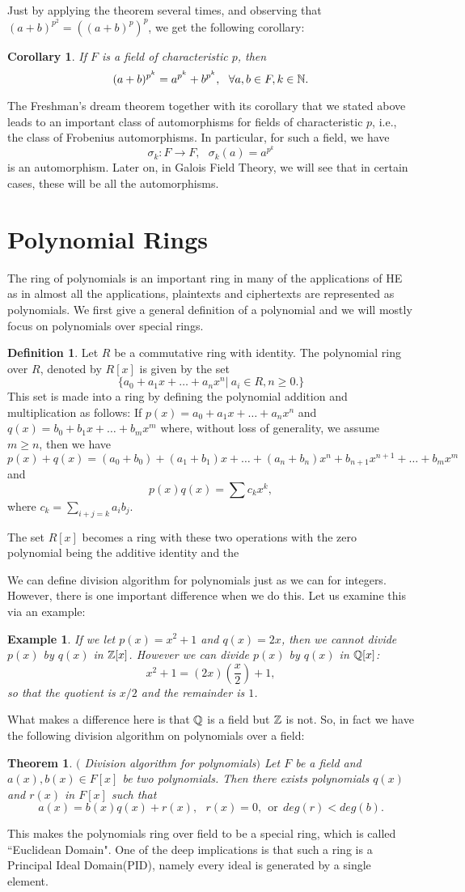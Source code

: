 \documentclass[12pt]{article}
\theoremstyle{plain}
\newtheorem{corollary}{Corollary}
\newtheorem{example}{Example}
\newtheorem{theorem}{Theorem}
\theoremstyle{definition}
\newtheorem{definition}{Definition}
\theoremstyle{remark}
\begin{document}
Just by applying the theorem several times, and observing that $(a+b)^{p^2} = ((a+b)^p)^p$, we get the following corollary:
\begin{corollary}
If $F$ is a field of characteristic $p$, then 
$$(a+b)^{p^k}= a^{p^k}+b^{p^k},  \:\:\:\forall a,b \in F, k\in \mathbb{N}.$$
\end{corollary}
The Freshman's dream theorem together with its corollary that we stated above leads to an important class of automorphisms for fields of characteristic $p$, i.e., the class of Frobenius automorphisms. In particular, for such a field, we have
$$\sigma_k:F\rightarrow F, \:\:\:\sigma_k(a)=a^{p^k}$$ is an automorphism. Later on, in Galois Field Theory, we will see that in certain cases, these will be all the automorphisms. 
\section{Polynomial Rings}
The ring of polynomials is an important ring in many of the applications of HE as in almost all the applications, plaintexts and ciphertexts are represented as polynomials. We first give a general definition of a polynomial and we will mostly focus on polynomials over special rings.
\begin{definition}
Let $R$ be a commutative ring with identity. The polynomial ring over $R$, denoted by $R[x]$ is given by the set 
$$\{a_0+a_1x+\dots +a_nx^n| \: a_i\in R, n\geq 0.\}$$
This set is made into a ring by defining the polynomial addition and multiplication as follows:
If $p(x)=a_0+a_1x+\dots +a_nx^n$ and $q(x)=b_0+b_1x+\dots+b_mx^m$ where, without loss of generality, we assume $m\geq n$, then we have
$$p(x)+q(x) = (a_0+b_0)+(a_1+b_1)x+\dots +(a_n+b_n)x^n+b_{n+1}x^{n+1}+\dots +b_mx^m$$ and 
$$p(x)q(x) = \sum c_kx^k,$$
where $c_k = \sum_{i+j=k}a_ib_j$.
\end{definition}
The set $R[x]$ becomes a ring with these two operations with the zero polynomial being the additive identity and the 

We can define division algorithm for polynomials just as we can for integers. However, there is one important difference when we do this. Let us examine this via an example:
\begin{example}
If we let $p(x)=x^2+1$ and $q(x)=2x$, then we cannot divide $p(x)$ by $q(x)$ in $\mathbb{Z}[x]$. However we can divide $p(x)$ by $q(x)$ in $\mathbb{Q}[x]$:
$$x^2+1 = (2x)(\frac{x}{2})+1,$$ so that the quotient is $x/2$ and the remainder is $1$. 
\end{example}
What makes a difference here is that $\mathbb{Q}$ is a field but $\mathbb{Z}$ is not. So, in fact we have the following division algorithm on polynomials over a field:
\begin{theorem}$($ Division algorithm for polynomials$)$
Let $F$ be a field and $a(x), b(x) \in F[x]$ be two polynomials. Then there exists polynomials $q(x)$ and $r(x)$ in $F[x]$ such that 
$$a(x) = b(x)q(x)+r(x), \:\:\: r(x)=0, \:\:\textrm{or}\:\: deg(r)<deg(b).$$
\end{theorem}
This makes the polynomials ring over field to be a special ring, which is called ``Euclidean Domain". One of the deep implications is that such a ring is a Principal Ideal Domain(PID), namely every ideal is generated by a single element. 
\end{document}

